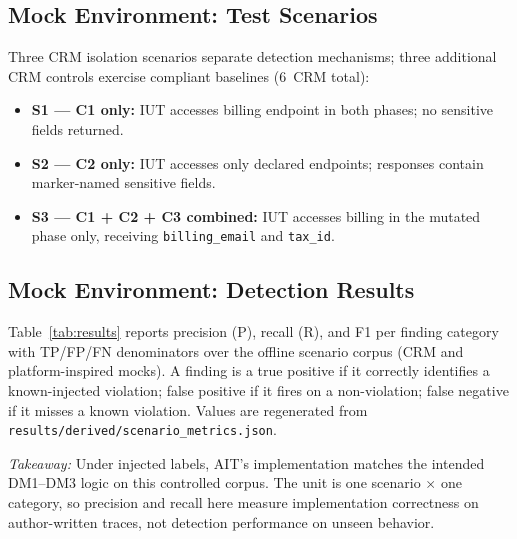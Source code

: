\documentclass[conference]{IEEEtran}
\begin{document}
\subsection{Mock Environment: Test Scenarios}

Three CRM isolation scenarios separate detection mechanisms; three additional
CRM controls exercise compliant baselines (6~CRM total):

\begin{itemize}
  \item \textbf{S1 --- C1 only:} IUT accesses billing endpoint in
        both phases; no sensitive fields returned.
  \item \textbf{S2 --- C2 only:} IUT accesses only declared endpoints;
        responses contain marker-named sensitive fields.
  \item \textbf{S3 --- C1 + C2 + C3 combined:} IUT accesses billing
        in the mutated phase only, receiving \texttt{billing\_email}
        and \texttt{tax\_id}.
\end{itemize}

\subsection{Mock Environment: Detection Results}

Table~\ref{tab:results} reports precision (P), recall (R), and F1 per
finding category with TP/FP/FN denominators over the offline scenario
corpus (CRM and platform-inspired mocks). A finding is a true positive
if it correctly identifies a known-injected violation; false positive if
it fires on a non-violation; false negative if it misses a known
violation. Values are regenerated from
\texttt{results/derived/scenario\_metrics.json}.

\begin{table}[htbp]
  \caption{Detection Performance, Offline Mock Corpus (category metrics
  with micro-average; implementation validation under injected labels)}
  \label{tab:results}
  \centering
  \renewcommand{\arraystretch}{1.25}
  \footnotesize
  \resizebox{\columnwidth}{!}{}
\end{table}

\noindent\textit{Takeaway:} Under injected labels, AIT's implementation
matches the intended DM1--DM3 logic on this controlled corpus. The unit
is one scenario $\times$ one category, so precision and recall here
measure implementation correctness on author-written traces, not
detection performance on unseen behavior.
\end{document}
